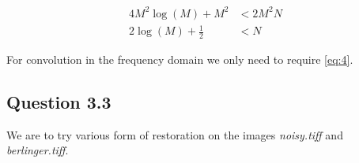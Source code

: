 \documentclass[a4paper, 10pt, final]{article}
\begin{document}
\begin{align}
  \label{eq:3}4M^{2}\log{(M)} + M^{2} & < 2M^{2}N \\
  \label{eq:4}2\log{(M)} + \frac{1}{2} & < N
\end{align}

For convolution in the frequency domain we only need to require \ref{eq:4}.

\subsection*{Question 3.3}

We are to try various form of restoration on the images
\emph{noisy.tiff} and \emph{berlinger.tiff}.




%
%
\end{document}
